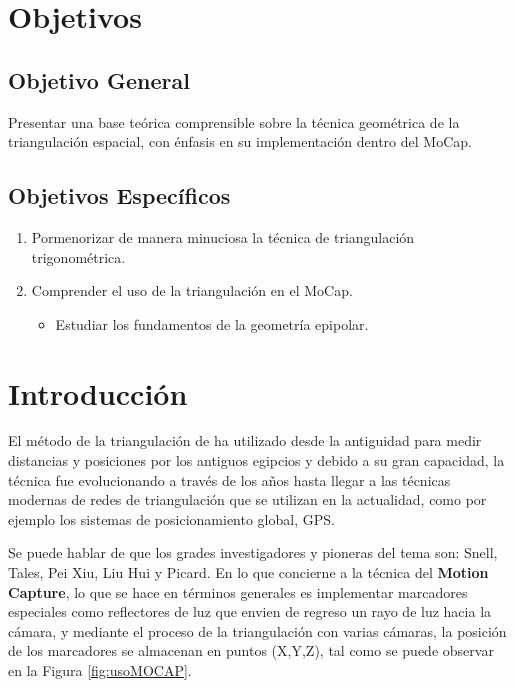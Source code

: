 \documentclass[11pt,letterpaper]{article}     %
\begin{document}
\section{Objetivos}
\subsection{Objetivo General}
Presentar una base te\' orica comprensible sobre la t\' ecnica geom\' etrica de la triangulaci\' on espacial, con \' enfasis en su implementaci\' on dentro del MoCap.
\subsection{Objetivos Espec\' ificos} 
\begin{enumerate}
\item Pormenorizar de manera minuciosa la t\' ecnica  de triangulaci\' on trigonom\' etrica.

\item Comprender el uso de la triangulaci\' on en el MoCap.
\begin{itemize}
\item Estudiar los fundamentos de la geometr\' ia epipolar.
\end{itemize}
\end{enumerate}

\section{Introducci\' on}

El m\' etodo de la triangulaci\' on de ha utilizado desde la antiguidad para medir distancias y posiciones por los antiguos egipcios y debido a su gran capacidad, la t\' ecnica fue evolucionando a trav\' es de los a\~ nos hasta llegar a las t\' ecnicas modernas de redes de triangulaci\' on que se utilizan en la actualidad, como por ejemplo los sistemas de posicionamiento global, GPS.

Se puede hablar de que los grades investigadores y pioneras del tema son: Snell, Tales, Pei Xiu, Liu Hui y Picard.
En lo que concierne a la t\' ecnica del \textbf{Motion Capture}, lo que se hace en t\' erminos generales es implementar marcadores especiales como reflectores de luz que envien de regreso un rayo de luz hacia la c\' amara, y mediante el proceso de la triangulaci\' on con varias c\' amaras, la posici\' on de los marcadores se almacenan en puntos (X,Y,Z), tal como se puede observar en la Figura \ref{fig:usoMOCAP}.
\end{document}
